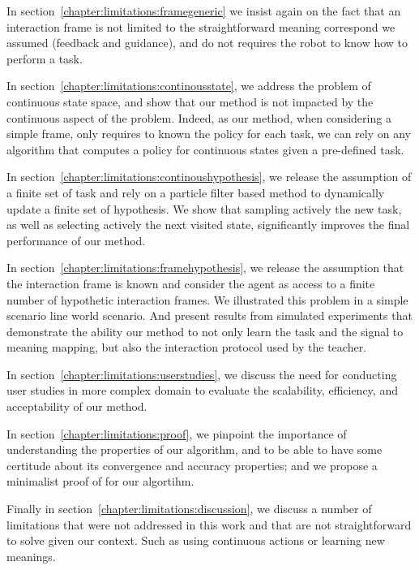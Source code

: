 In section~\ref{chapter:limitations:framegeneric} we insist again on the fact that an interaction frame is not limited to the straightforward meaning correspond we assumed (feedback and guidance), and do not requires the robot to know how to perform a task.

In section~\ref{chapter:limitations:continousstate}, we address the problem of continuous state space, and show that our method is not impacted by the continuous aspect of the problem. Indeed, as our method, when considering a simple frame, only requires to known the policy for each task, we can rely on any algorithm that computes a policy for continuous states given a pre-defined task.

In section~\ref{chapter:limitations:continoushypothesis}, we release the assumption of a finite set of task and rely on a particle filter based method to dynamically update a finite set of hypothesis. We show that sampling actively the new task, as well as selecting actively the next visited state, significantly improves the final performance of our method.

In section~\ref{chapter:limitations:framehypothesis}, we release the assumption that the interaction frame is known and consider the agent as access to a finite number of hypothetic interaction frames. We illustrated this problem in a simple scenario line world scenario. And present results from simulated experiments that demonstrate the ability our method to not only learn the task and the signal to meaning mapping, but also the interaction protocol used by the teacher.

In section~\ref{chapter:limitations:userstudies}, we discuss the need for conducting user studies in more complex domain to evaluate the scalability, efficiency, and acceptability of our method.

In section~\ref{chapter:limitations:proof}, we pinpoint the importance of understanding the properties of our algorithm, and to be able to have some certitude about its convergence and accuracy properties; and we propose a minimalist proof of for our algortihm.

Finally in section~\ref{chapter:limitations:discussion}, we discuss a number of limitations that were not addressed in this work and that are not straightforward to solve given our context. Such as using continuous actions or learning new meanings.











